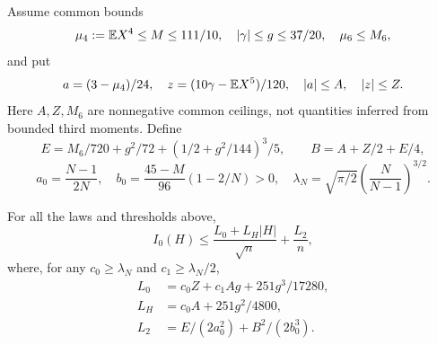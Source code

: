Assume common bounds
\[
 \mu_4:=\mathbb E X^4\le M\le111/10,\quad |\gamma|\le g\le37/20,
 \quad\mu_6\le M_6,
\]
and put
\[
 a=(3-\mu_4)/24,\quad z=(10\gamma-\mathbb E X^5)/120,
 \quad |a|\le A,\quad |z|\le Z.
\]
Here $A,Z,M_6$ are nonnegative common ceilings, not quantities inferred
from bounded third moments. Define
\[
 E=M_6/720+g^2/72+(1/2+g^2/144)^3/5,\qquad
 B=A+Z/2+E/4,
\]
\[
 a_0=\frac{N-1}{2N},\quad b_0=\frac{45-M}{96}(1-2/N)>0,
 \quad\lambda_N=\sqrt{\pi/2}\left(\frac N{N-1}\right)^{3/2}.
\]
\begin{proposition}\label{v9:fourier:low}
For all the laws and thresholds above,
\[
 I_0(H)\le\frac{L_0+L_H|H|}{\sqrt n}+\frac{L_2}{n},
\]
where, for any $c_0\ge\lambda_N$ and $c_1\ge\lambda_N/2$,
\begin{align*}
 L_0&=c_0Z+c_1Ag+251g^3/17280,\\
 L_H&=c_0A+251g^2/4800,\\
 L_2&=E/(2a_0^2)+B^2/(2b_0^3).
\end{align*}
\end{proposition}

